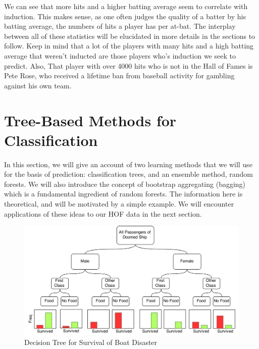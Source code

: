 \documentclass[preprint,12pt]{elsarticle}
\begin{document}
We can see that more hits and a higher batting average seem to correlate with induction. This makes sense, as one often judges the quality of a batter by his batting average, the numbers of hits a player has per at-bat. The interplay between all of these statistics will be elucidated in more details in the sections to follow. Keep in mind that a lot of the players with many hits and a high batting average that weren't inducted are those players who's induction we seek to predict. Also, That player with over 4000 hits who is not in the Hall of Fames is Pete Rose, who received a lifetime ban from baseball activity for gambling against his own team.







\section{Tree-Based Methods for Classification}
\label{method}

In this section, we will give an account of two learning methods that we will use for the basis of prediction: classification trees, and an ensemble method, random forests. We will also introduce the concept of bootstrap aggregating (bagging) which is a fundamental ingredient of random forests. The information here is theoretical, and will be motivated by a simple example. We will encounter applications of these ideas to our HOF data in the next section.
\begin{figure}[h]
	\centering
	\includegraphics[width=1\textwidth]{TreeExample}
	\caption{Decision Tree for Survival of Boat Disaster}
	\label{fig:SampleTree}
\end{figure}
\end{document}
